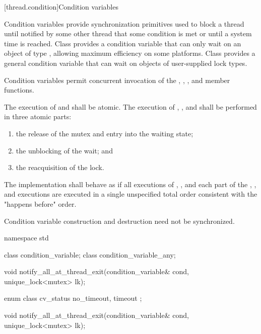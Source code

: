 [thread.condition]{Condition variables}

\pnum
Condition variables provide synchronization primitives used to block a thread until
notified by some other thread that some condition is met or until a system time is
reached. Class  provides a condition variable that can only
wait on an object of type , allowing maximum efficiency on some
platforms. Class  provides a general condition variable
that can wait on objects of user-supplied lock types.

\pnum
Condition variables permit concurrent invocation of the , ,
,  and  member functions.

\pnum
The execution of  and  shall be atomic. The
execution of , , and  shall be performed
in three atomic parts:

\begin{enumerate}
\item the release of the mutex and entry into the waiting state;
\item the unblocking of the wait; and
\item the reacquisition of the lock.
\end{enumerate}

\pnum
The implementation shall behave as if all executions of , , and each
part of the , , and  executions are
executed in a single unspecified total order consistent with the "happens before" order.

\pnum
Condition variable construction and destruction need not be synchronized.

%

\begin{codeblock}
namespace std {
  class condition_variable;
  class condition_variable_any;

  void notify_all_at_thread_exit(condition_variable& cond, unique_lock<mutex> lk);

  enum class cv_status { no_timeout, timeout };
}
\end{codeblock}

%
\begin{itemdecl}
void notify_all_at_thread_exit(condition_variable& cond, unique_lock<mutex> lk);
\end{itemdecl}

